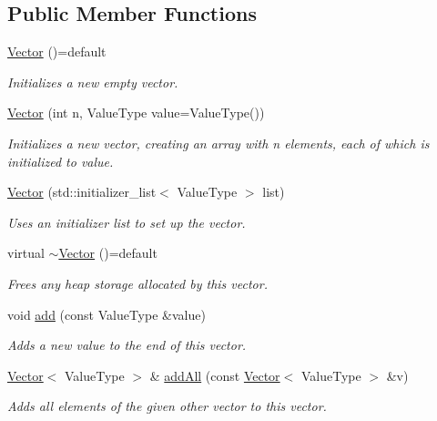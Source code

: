 \subsection*{Public Member Functions}
\begin{DoxyCompactItemize}
\item 
\mbox{\hyperlink{classVector_aba83f7828d95b601500471996fc8c3c0}{Vector}} ()=default
\begin{DoxyCompactList}\small\item\em Initializes a new empty vector. \end{DoxyCompactList}\item 
\mbox{\hyperlink{classVector_abf5f4a6c2e8f722dfaed5c07027a84ac}{Vector}} (int n, Value\+Type value=Value\+Type())
\begin{DoxyCompactList}\small\item\em Initializes a new vector, creating an array with {\ttfamily n} elements, each of which is initialized to {\ttfamily value}. \end{DoxyCompactList}\item 
\mbox{\hyperlink{classVector_a81ccc7dac38b6bdeca04281b1acb39c0}{Vector}} (std\+::initializer\+\_\+list$<$ Value\+Type $>$ list)
\begin{DoxyCompactList}\small\item\em Uses an initializer list to set up the vector. \end{DoxyCompactList}\item 
virtual \mbox{\hyperlink{classVector_a46f51c573db980ae2ae366dba3daf53d}{$\sim$\+Vector}} ()=default
\begin{DoxyCompactList}\small\item\em Frees any heap storage allocated by this vector. \end{DoxyCompactList}\item 
void \mbox{\hyperlink{classVector_ab901606bf3a8019c986f0cf9a9f298dc}{add}} (const Value\+Type \&value)
\begin{DoxyCompactList}\small\item\em Adds a new value to the end of this vector. \end{DoxyCompactList}\item 
\mbox{\hyperlink{classVector}{Vector}}$<$ Value\+Type $>$ \& \mbox{\hyperlink{classVector_a7e05c14d67a60defeb6723b5704967a6}{add\+All}} (const \mbox{\hyperlink{classVector}{Vector}}$<$ Value\+Type $>$ \&v)
\begin{DoxyCompactList}\small\item\em Adds all elements of the given other vector to this vector. \end{DoxyCompactList}\item 

\end{DoxyCompactItemize}
